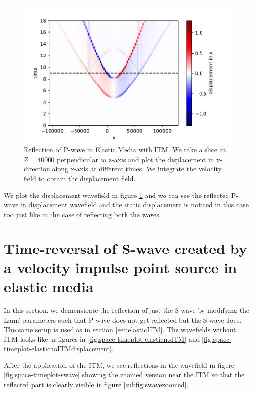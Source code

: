 \begin{figure}[!htpb] %
    \centering
    \includegraphics[width=0.75\linewidth]{figures/pwave-ITMdisplacement.pdf}
    \caption{Reflection of P-wave in Elastic Media with \ac{ITM}. We take a slice at $Z=40000$ perpendicular to z-axis
    and plot the displacement in x-direction along x-axis at different times. We integrate the velocity field to obtain the displacement field.}
    \label{fig:space-timeplot-pwavedisplacement}
\end{figure}

We plot the displacement wavefield in figure \ref{fig:space-timeplot-pwavedisplacement} and we can see the reflected P- wave in displacement wavefield and the static
displacement is noticed in this case too just like in the case of reflecting both the waves. 

\section{Time-reversal of S-wave created by a velocity impulse point source in elastic media} \label{sec:elasticITMswave}
In this section, we demonstrate the reflection of just the S-wave by modifying the Lam\'{e} parameters such that P-wave does not
get reflected but the S-wave does. The same setup is used as in section \ref{sec:elasticITM}. The wavefields without \ac{ITM} looks like in figures in \ref{fig:space-timeplot-elasticnoITM}
and \ref{fig:space-timeplot-elasticnoITMdisplacement}.
\par After the application of the \ac{ITM}, we see reflections in the wavefield in figure \ref{fig:space-timeplot-swave} showing the zoomed version near the 
\ac{ITM} so that the reflected part is clearly visible in figure \ref{subfig:swavezoomed}.

